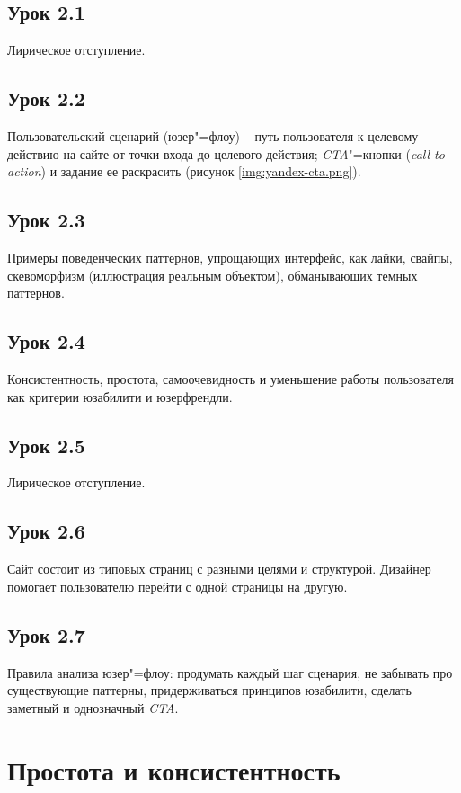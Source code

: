\documentclass[variant=practice]{bsuir}
\begin{document}
\subsection{Урок 2.1} Лирическое отступление.

\subsection{Урок 2.2} Пользовательский сценарий (юзер"=флоу) -- путь
пользователя к целевому действию на сайте от точки входа до целевого действия;
\textit{CTA}"=кнопки (\textit{call-to-action}) и задание ее раскрасить (рисунок
\ref{img:yandex-cta.png}).

\subsection{Урок 2.3} Примеры поведенческих паттернов, упрощающих интерфейс, как
лайки, свайпы, скевоморфизм (иллюстрация реальным объектом), обманывающих темных
паттернов.

\subsection{Урок 2.4} Консистентность, простота, самоочевидность и уменьшение
работы пользователя как критерии юзабилити и юзерфрендли.

\subsection{Урок 2.5} Лирическое отступление.

\subsection{Урок 2.6} Сайт состоит из типовых страниц с разными целями и
структурой. Дизайнер помогает пользователю перейти с одной страницы на другую.

\subsection{Урок 2.7} Правила анализа юзер"=флоу: продумать каждый шаг сценария,
не забывать про существующие паттерны, придерживаться принципов юзабилити,
сделать заметный и однозначный \textit{CTA}.


\section{Простота и консистентность}
\end{document}
